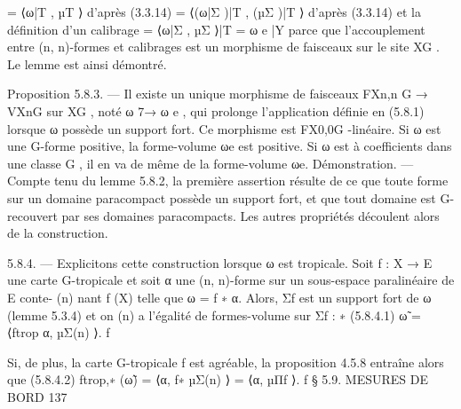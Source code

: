 \documentclass[
  10pt,
]{article}
\newenvironment{Shaded}{}{}
\newcommand{\NormalTok}[1]{#1}
\begin{document}
\begin{Shaded}
\begin{Highlighting}[]
\NormalTok{            = ⟨ω|T , µT ⟩                  d’après (3.3.14)}
\NormalTok{            = ⟨(ω|Σ )|T , (µΣ )|T ⟩        d’après (3.3.14) et la définition d’un calibrage}
\NormalTok{            = ⟨ω|Σ , µΣ ⟩|T = ω}
\NormalTok{                              e |Y}
\NormalTok{parce que l’accouplement entre (n, n){-}formes et calibrages est un morphisme de faisceaux}
\NormalTok{sur le site XG . Le lemme est ainsi démontré.}

\NormalTok{Proposition 5.8.3. — Il existe un unique morphisme de faisceaux FXn,n            G}
\NormalTok{                                                                                    → VXnG}
\NormalTok{sur XG , noté ω 7→ ω e , qui prolonge l’application définie en (5.8.1) lorsque ω possède}
\NormalTok{un support fort. Ce morphisme est FX0,0G {-}linéaire. Si ω est une G{-}forme positive, la}
\NormalTok{forme{-}volume ωe est positive. Si ω est à coefficients dans une classe G , il en va de même}
\NormalTok{de la forme{-}volume ωe.}
\NormalTok{Démonstration. — Compte tenu du lemme 5.8.2, la première assertion résulte de ce que}
\NormalTok{toute forme sur un domaine paracompact possède un support fort, et que tout domaine}
\NormalTok{est G{-}recouvert par ses domaines paracompacts. Les autres propriétés découlent alors}
\NormalTok{de la construction.}

\NormalTok{5.8.4. — Explicitons cette construction lorsque ω est tropicale. Soit f : X → E une}
\NormalTok{carte G{-}tropicale et soit α une (n, n){-}forme sur un sous{-}espace paralinéaire de E conte{-}}
\NormalTok{                                         (n)}
\NormalTok{nant f (X) telle que ω = f ∗ α. Alors, Σf est un support fort de ω (lemme 5.3.4) et on}
\NormalTok{                                         (n)}
\NormalTok{a l’égalité de formes{-}volume sur Σf            :}
\NormalTok{                                                ∗}
\NormalTok{(5.8.4.1)                                ω̃ = ⟨ftrop α, µΣ(n) ⟩.}
\NormalTok{                                                            f}

\NormalTok{Si, de plus, la carte G{-}tropicale f est agréable, la proposition 4.5.8 entraîne alors que}
\NormalTok{(5.8.4.2)                       ftrop,∗ (ω̃) = ⟨α, f∗ µΣ(n) ⟩ = ⟨α, µΠf ⟩.}
\NormalTok{                                                        f}
\NormalTok{                                   § 5.9. MESURES DE BORD                                  137}


\end{Highlighting}
\end{Shaded}
\end{document}
